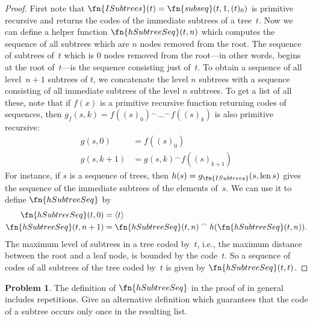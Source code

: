 \documentclass[10pt,a4paper]{article}
\makeatletter
\theoremstyle{plain}
\theoremstyle{definition}
\newtheorem{prob}{Problem}[section]
\theoremstyle{remark}
\newcommand{\olref}{\@ifnextchar[{\olref@i}{\olref@final}}
\def\olref@i[#1]{\@ifnextchar[{\olref@ii}{\olref@final}}
\def\olref@ii[#1]{\@ifnextchar[{\olref@iii}{\olref@final}}
\def\olref@iii[#1]{\olref@final}
\def\olref@final#1{\ref{#1}}
\providecommand{\tuple}[1]{\langle #1 \rangle}
\providecommand{\len}{\operatorname{len}}
\providecommand{\concat}{\mathbin{{}^\frown}}
\makeatother
\begin{document}
\begin{proof}
  First note that $\fn{ISubtrees}(t) = \fn{subseq}(t, 1, (t)_0)$ is
  primitive recursive and returns the codes of the immediate subtrees
  of a tree~$t$. Now we can define a helper function
  $\fn{hSubtreeSeq}(t,n)$ which computes the sequence of all subtrees
  which are $n$ nodes removed from the root. The sequence of subtrees
  of~$t$ which is $0$ nodes removed from the root---in other words,
  begins at the root of~$t$---is the sequence consisting just
  of~$t$. To obtain a sequence of all level~$n+1$ subtrees of $t$, we
  concatenate the level $n$ subtrees with a sequence consisting of all
  immediate subtrees of the level $n$ subtrees. To get a list of all
  these, note that if $f(x)$ is a primitive recursive function
  returning codes of sequences, then $g_f(s, k) = f((s)_0) \concat
  \dots \concat f((s)_k)$ is also primitive recursive:
    \begin{align*}
      g(s, 0) & = f((s)_0)\\
      g(s, k+1) & = g(s, k) \concat f((s)_{k+1})
    \end{align*}
    For instance, if $s$ is a sequence of trees, then
    $h(s) = g_{\fn{ISubtrees}}(s, \len{s})$ gives the sequence of the
    immediate subtrees of the elements of~$s$. We can use it to define
    $\fn{hSubtreeSeq}$ by
    \begin{align*}
      \fn{hSubtreeSeq}(t, 0) & = \tuple{t} \\
      \fn{hSubtreeSeq}(t, n+1) & = \fn{hSubtreeSeq}(t, n) \concat
      h(\fn{hSubtreeSeq}(t, n)).
    \end{align*}
    The maximum level of subtrees in a tree coded by~$t$, i.e., the
    maximum distance between the root and a leaf node, is bounded by
    the code~$t$. So a sequence of codes of all subtrees of the tree
    coded by~$t$ is given by $\fn{hSubtreeSeq}(t, t)$.
\end{proof}

\begin{prob}
  The definition of $\fn{hSubtreeSeq}$ in the proof of
  \olref[cmp][rec][tre]{prop:subtreeseq} in general includes
  repetitions. Give an alternative definition which guarantees that
  the code of a subtree occurs only once in the resulting list.
\end{prob}
\end{document}
